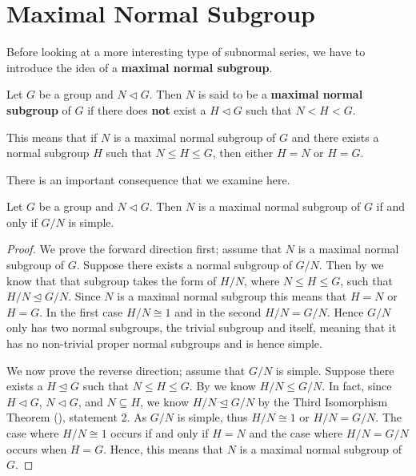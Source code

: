 \section{Maximal Normal Subgroup}
Before looking at a more interesting type of subnormal series, we have to introduce the idea of a \textbf{maximal normal subgroup}.
\begin{definition}
    Let $G$ be a group and $N \lhd G$. Then $N$ is said to be a \textbf{maximal normal subgroup} of $G$ if there does \textbf{not} exist a $H \lhd G$ such that $N < H < G$.
\end{definition}
\begin{remark}
    This means that if $N$ is a maximal normal subgroup of $G$ and there exists a normal subgroup $H$ such that $N \leq H \leq G$, then either $H = N$ or $H = G$.
\end{remark}

There is an important consequence that we examine here.
\begin{theorem}\label{thrm-maximal-normal-subgroup-iff-quotient-is-simple}
    Let $G$ be a group and $N \lhd G$. Then $N$ is a maximal normal subgroup of $G$ if and only if $G/N$ is simple.
\end{theorem}

\begin{proof}
    We prove the forward direction first; assume that $N$ is a maximal normal subgroup of $G$. Suppose there exists a normal subgroup of $G/N$. Then by  we know that that subgroup takes the form of $H/N$, where $N \leq H \leq G$, such that $H/N \unlhd G/N$. Since $N$ is a maximal normal subgroup this means that $H = N$ or $H = G$. In the first case $H/N \cong 1$ and in the second $H / N = G/N$. Hence $G/N$ only has two normal subgroups, the trivial subgroup and itself, meaning that it has no non-trivial proper normal subgroups and is hence simple.
    
    We now prove the reverse direction; assume that $G/N$ is simple. Suppose there exists a $H \unlhd G$ such that $N \leq H \leq G$. By  we know $H/N \leq G/N$. In fact, since $H \lhd G$, $N \lhd G$, and $N \subseteq H$, we know $H/N \unlhd G/N$ by the Third Isomorphism Theorem (), statement 2. As $G/N$ is simple, thus $H/N \cong 1$ or $H/N = G/N$. The case where $H/N \cong 1$ occurs if and only if $H = N$ and the case where $H/N = G/N$ occurs when $H = G$. Hence, this means that $N$ is a maximal normal subgroup of $G$.
\end{proof}

